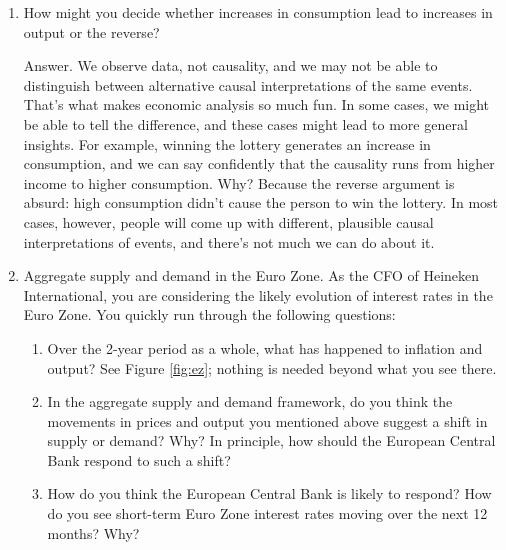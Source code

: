 \documentclass[letterpaper,12pt]{article}
\begin{document}
\begin{enumerate}
\item How might you decide whether increases in consumption lead to 
increases in output or the reverse?  

Answer.  We observe data, not causality, 
and we may not be able to distinguish between 
alternative causal interpretations of the same events. 
That's what makes economic analysis so much fun.  
In some cases, we might be able to tell the difference, 
and these cases might lead to more general insights.
For example, winning the lottery generates an increase in consumption,
and we can say confidently that the causality runs from 
higher income to higher consumption. 
Why?  Because the reverse argument is absurd:  
high consumption didn't cause the person to win the lottery.  
In most cases, however, people will come up with different, 
plausible causal interpretations of events, 
and there's not much we can do about it.  

\item Aggregate supply and demand in the Euro Zone.
As the CFO of Heineken International, you are considering
the likely evolution of interest rates in the Euro Zone.  
You quickly run through the following questions:  
%
\begin{enumerate}

\item Over the 2-year period as a whole, 
    what has happened to inflation and output?  
    See Figure \ref{fig:ez}; 
    nothing is needed beyond what you see there.

\item In the aggregate supply and demand framework, 
    do you think the movements in prices and output 
    you mentioned above suggest a shift in supply or demand?  Why?  
    In principle, 
    how should the European Central Bank respond to such a shift? 

\item How do you think the European Central Bank is 
likely to respond?
How do you see short-term Euro Zone 
interest rates moving over the next 12 months? Why?  

\end{enumerate}


\end{enumerate}
\end{document}
